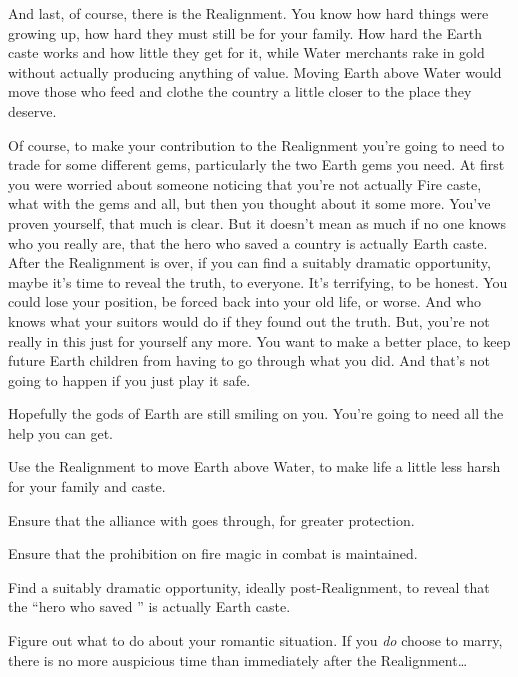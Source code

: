 \documentclass[char]{iron}
\begin{document}
And last, of course, there is
the Realignment.  You know how hard things were growing up, how hard they must
still be for your family.  How hard the Earth caste works and how little
they get for it, while Water merchants rake in gold without actually
producing anything of value.  Moving Earth above Water would move those
who feed and clothe the country a little closer to the place they deserve.

Of course, to make your contribution to the Realignment you're going
to need to trade for some different gems, particularly the two Earth
gems you need.  At first you were worried about someone noticing that
you're not actually Fire caste, what with the gems and all, but then
you thought about it some more.  You've proven yourself, that much is
clear.  But it doesn't mean as much if no one knows who you really
are, that the hero who saved a country is actually Earth caste.  After
the Realignment is over, if you can find a suitably dramatic
opportunity, maybe it's time to reveal the truth, to everyone.  It's
terrifying, to be honest.  You could lose your position, be forced
back into your old life, or worse.  And who knows what your suitors
would do if they found out the truth.  But, you're not really in this
just for yourself any more.  You want to make \sHomeCountry{} a better
place, to keep future Earth children from having to go through what
you did.  And that's not going to happen if you just play it safe.

Hopefully the gods of Earth are still smiling on you.  You're going to
need all the help you can get.

\begin{itemz}[Goals]
\item Use the Realignment to move Earth above Water, to make life a little
  less harsh for your family and caste.
\item Ensure that the alliance with \sTreatyCountry{} goes through,
  for greater protection.
\item Ensure that the prohibition on fire magic in combat is maintained.
\item Find a suitably dramatic opportunity, ideally post-Realignment,
  to reveal that the ``hero who saved \sHomeCountry{}'' is actually Earth caste.
\item Figure out what to do about your romantic situation. If you \emph{do} choose to marry, there is no more auspicious time than immediately after the Realignment\ldots{}
\end{itemz}
\end{document}
